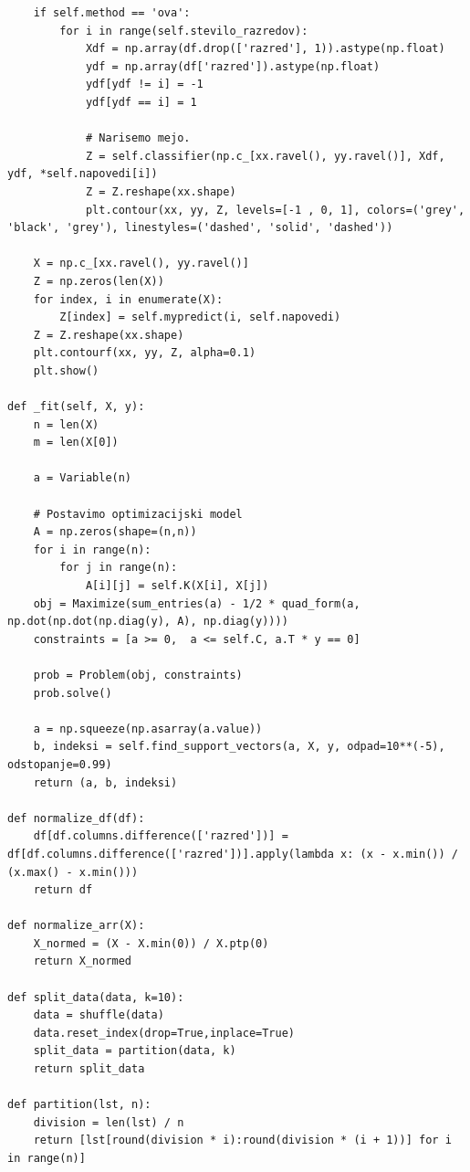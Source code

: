 \documentclass[mat1]{fmfdelo}
\begin{document}
\begin{scriptsize}
\begin{verbatim}
    if self.method == 'ova':
        for i in range(self.stevilo_razredov):
            Xdf = np.array(df.drop(['razred'], 1)).astype(np.float)
            ydf = np.array(df['razred']).astype(np.float)
            ydf[ydf != i] = -1
            ydf[ydf == i] = 1
            
            # Narisemo mejo.
            Z = self.classifier(np.c_[xx.ravel(), yy.ravel()], Xdf, ydf, *self.napovedi[i])
            Z = Z.reshape(xx.shape)
            plt.contour(xx, yy, Z, levels=[-1 , 0, 1], colors=('grey', 'black', 'grey'), linestyles=('dashed', 'solid', 'dashed'))
    
    X = np.c_[xx.ravel(), yy.ravel()]
    Z = np.zeros(len(X))
    for index, i in enumerate(X):
        Z[index] = self.mypredict(i, self.napovedi)
    Z = Z.reshape(xx.shape)
    plt.contourf(xx, yy, Z, alpha=0.1)
    plt.show()
    
def _fit(self, X, y):
    n = len(X)
    m = len(X[0])

    a = Variable(n)

    # Postavimo optimizacijski model
    A = np.zeros(shape=(n,n))
    for i in range(n):
        for j in range(n):
            A[i][j] = self.K(X[i], X[j])
    obj = Maximize(sum_entries(a) - 1/2 * quad_form(a, np.dot(np.dot(np.diag(y), A), np.diag(y))))
    constraints = [a >= 0,  a <= self.C, a.T * y == 0]
    
    prob = Problem(obj, constraints)
    prob.solve()

    a = np.squeeze(np.asarray(a.value))
    b, indeksi = self.find_support_vectors(a, X, y, odpad=10**(-5), odstopanje=0.99)
    return (a, b, indeksi)
    
def normalize_df(df):
    df[df.columns.difference(['razred'])] = df[df.columns.difference(['razred'])].apply(lambda x: (x - x.min()) / (x.max() - x.min())) 
    return df    
    
def normalize_arr(X):
    X_normed = (X - X.min(0)) / X.ptp(0)
    return X_normed
    
def split_data(data, k=10):
    data = shuffle(data)
    data.reset_index(drop=True,inplace=True)
    split_data = partition(data, k)
    return split_data
        
def partition(lst, n):
    division = len(lst) / n
    return [lst[round(division * i):round(division * (i + 1))] for i in range(n)]

\end{verbatim}
\end{scriptsize}
\end{document}
